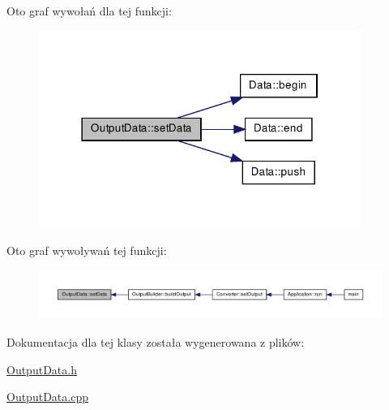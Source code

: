 \-Oto graf wywołań dla tej funkcji\-:\nopagebreak
\begin{figure}[H]
\begin{center}
\leavevmode
\includegraphics[width=298pt]{class_output_data_a46b8027d2773c914affbb6051b625930_cgraph}
\end{center}
\end{figure}




\-Oto graf wywoływań tej funkcji\-:\nopagebreak
\begin{figure}[H]
\begin{center}
\leavevmode
\includegraphics[width=350pt]{class_output_data_a46b8027d2773c914affbb6051b625930_icgraph}
\end{center}
\end{figure}




\-Dokumentacja dla tej klasy została wygenerowana z plików\-:\begin{DoxyCompactItemize}
\item 
\hyperlink{_output_data_8h}{\-Output\-Data.\-h}\item 
\hyperlink{_output_data_8cpp}{\-Output\-Data.\-cpp}\end{DoxyCompactItemize}

